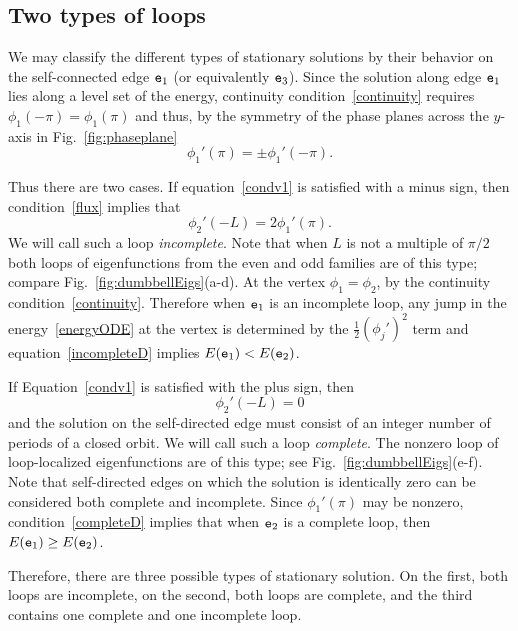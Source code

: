 \documentclass{article}
\numberwithin{equation}{section}
\numberwithin{figure}{section}
\begin{document}
\subsection{Two types of loops}

We may classify the different types of stationary solutions by their behavior on the  self-connected edge $\mathtt{e}_1$ (or equivalently $\mathtt{e}_3$).  Since the solution along edge $\mathtt{e}_1$ lies along a level set of the energy, continuity condition~\eqref{continuity} requires $\phi_1(-\pi) = \phi_1(\pi)$ and thus, by the symmetry of the phase planes across the $y$-axis in Fig.~\ref{fig:phaseplane} 
\begin{equation}
\phi_1'(\pi) = \pm \phi_1'(-\pi).
\label{condv1}
\end{equation}

Thus there are two cases. If equation~\eqref{condv1} is satisfied with a minus sign, then condition~\eqref{flux} implies that 
\begin{equation}
\phi_2'(-L) = 2 \phi_1'(\pi). 
\label{incompleteD}
\end{equation}
We will call such a loop \emph{incomplete}. Note that when $L$ is not a multiple of $\pi/2$ both loops of  eigenfunctions from the even and odd families are of this type; compare Fig.~\ref{fig:dumbbellEigs}(a-d). At the vertex $\phi_1 = \phi_2$, by the continuity condition~\eqref{continuity}. Therefore when $\mathtt{e}_1$ is an incomplete loop, any jump in the energy~\eqref{energyODE} at the vertex is determined by the $\frac{1}{2}{(\phi_j')}^2$ term and equation~\eqref{incompleteD} implies $E(\mathtt{e}_1)< E(\mathtt{e}_2)$.

If Equation~\eqref{condv1} is satisfied with the plus sign, then 
\begin{equation}
\phi_2'(-L) = 0
\label{completeD}
\end{equation}
and the solution on the self-directed edge must consist of an integer number of periods of a closed orbit. We will call such a loop \emph{complete}. The nonzero loop of loop-localized eigenfunctions are  of this type; see Fig.~\ref{fig:dumbbellEigs}(e-f). Note that self-directed edges on which the solution is identically zero  can be considered both complete and incomplete. Since $\phi_1'(\pi)$ may be nonzero, condition~\eqref{completeD} implies that when $\mathtt{e}_2$ is a complete loop, then $E(\mathtt{e}_1) \ge E(\mathtt{e}_2)$. 

Therefore, there are three possible types of stationary solution. On the first, both loops are incomplete, on the second, both loops are complete, and the third contains one complete and one incomplete loop.
\end{document}
